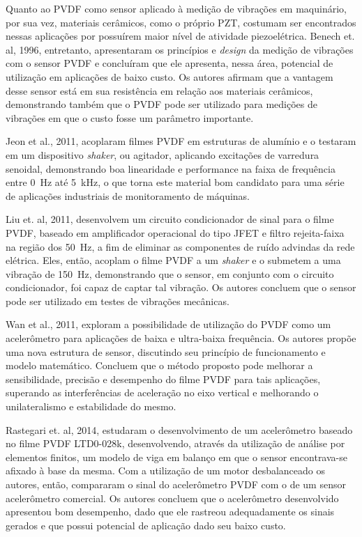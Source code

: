 \documentclass[
	12pt,				
	oneside,			
	a4paper,			
	english,			
	brazil,			
	]{abntex2ppgsi}
\begin{document}
Quanto ao PVDF como sensor aplicado à medição de vibrações em maquinário, por sua vez, materiais cerâmicos, como o próprio PZT, costumam ser encontrados nessas aplicações por possuírem maior nível de atividade piezoelétrica. Benech et. al, 1996, entretanto, apresentaram os princípios e \textit{design} da medição de vibrações com o sensor PVDF e concluíram que ele apresenta, nessa área, potencial de utilização em aplicações de baixo custo. Os autores afirmam que a vantagem desse sensor está em sua resistência em relação aos materiais cerâmicos, demonstrando também que o PVDF pode ser utilizado para medições de vibrações em que o custo fosse um parâmetro importante. 

Jeon et al., 2011, acoplaram filmes PVDF em estruturas de alumínio e o testaram em um dispositivo \textit{shaker}, ou agitador, aplicando excitações de varredura senoidal, demonstrando boa linearidade e performance na faixa de frequência entre \SI{0}{\hertz} até \SI{5}{\kilo\hertz}, o que torna este material bom candidato para uma série de aplicações industriais de monitoramento de máquinas.

Liu et. al, 2011, desenvolvem um circuito condicionador de sinal para o filme PVDF, baseado em amplificador operacional do tipo JFET e filtro rejeita-faixa na região dos \SI{50}{\hertz}, a fim de eliminar as componentes de ruído advindas da rede elétrica. Eles, então, acoplam o filme PVDF a um \textit{shaker} e o submetem a uma vibração de \SI{150}{\hertz}, demonstrando que o sensor, em conjunto com o circuito condicionador, foi capaz de captar tal vibração. Os autores concluem que o sensor pode ser utilizado em testes de vibrações mecânicas. 

Wan et al., 2011, exploram a possibilidade de utilização do PVDF como um acelerômetro para aplicações de baixa e ultra-baixa frequência. Os autores propõe uma nova estrutura de sensor, discutindo seu princípio de funcionamento e modelo matemático. Concluem que o método proposto pode melhorar a sensibilidade, precisão e desempenho do filme PVDF para tais aplicações, superando as interferências de aceleração no eixo vertical e melhorando o unilateralismo e estabilidade do mesmo.

Rastegari et. al, 2014, estudaram o desenvolvimento de um acelerômetro baseado no filme PVDF LTD0-028k, desenvolvendo, através da utilização de análise por elementos finitos, um modelo de viga em balanço em que o sensor encontrava-se afixado à base da mesma. Com a utilização de um motor desbalanceado os autores, então, compararam o sinal do acelerômetro PVDF com o de um sensor acelerômetro comercial. Os autores concluem que o acelerômetro desenvolvido apresentou bom desempenho, dado que ele rastreou adequadamente os sinais gerados e que possui potencial de aplicação dado seu baixo custo. 
\end{document}
